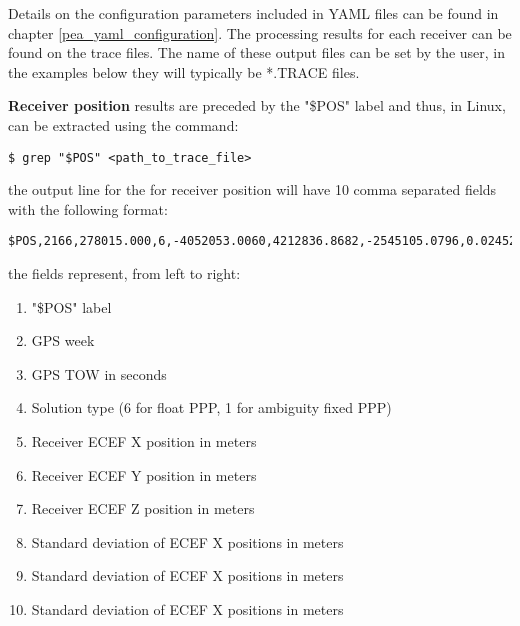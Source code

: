 Details on the configuration parameters included in YAML files can be found in chapter \ref{pea_yaml_configuration}. The processing results for each receiver can be found on the trace files. The name of these output files can be set by the user, in the examples below they will typically be *.TRACE files.

\textbf{Receiver position}  results are preceded by the "\$POS" label and thus, in Linux, can be extracted using the command:
 \begin{verbatim}
$ grep "$POS" <path_to_trace_file>
\end{verbatim}
the output line for the for receiver position will have 10 comma separated fields with the following format:
\begin{verbatim}
$POS,2166,278015.000,6,-4052053.0060,4212836.8682,-2545105.0796,0.0245227,0.0231919,0.0163678
\end{verbatim}
the fields represent, from left to right:
\begin{enumerate}
	\item  "\$POS" label
	\item  GPS week
	\item  GPS TOW in seconds
	\item  Solution type (6 for float PPP, 1 for ambiguity fixed PPP)
	\item  Receiver ECEF X position in meters
	\item  Receiver ECEF Y position in meters
	\item  Receiver ECEF Z position in meters
	\item  Standard deviation of ECEF X positions in meters
	\item  Standard deviation of ECEF X positions in meters
	\item  Standard deviation of ECEF X positions in meters
\end{enumerate}

